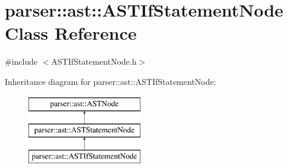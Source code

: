 \hypertarget{classparser_1_1ast_1_1ASTIfStatementNode}{}\section{parser\+:\+:ast\+:\+:A\+S\+T\+If\+Statement\+Node Class Reference}
\label{classparser_1_1ast_1_1ASTIfStatementNode}


{\ttfamily \#include $<$A\+S\+T\+If\+Statement\+Node.\+h$>$}

Inheritance diagram for parser\+:\+:ast\+:\+:A\+S\+T\+If\+Statement\+Node\+:\begin{figure}[H]
\begin{center}
\leavevmode
\includegraphics[height=3.000000cm]{d3/de4/classparser_1_1ast_1_1ASTIfStatementNode}
\end{center}
\end{figure}
